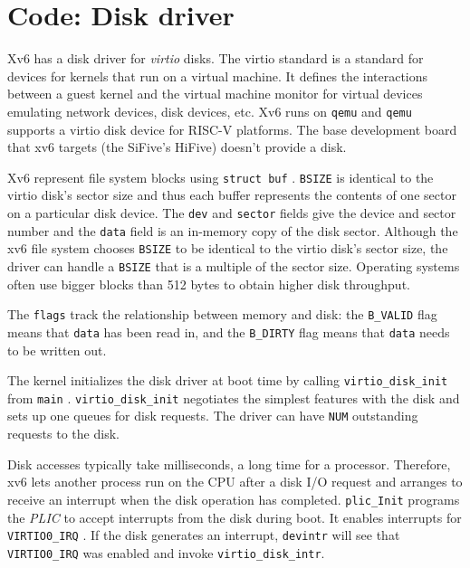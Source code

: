 \section{Code: Disk driver}

Xv6 has a disk driver for \textit{virtio} disks. The
virtio standard is a standard for devices for kernels that run on a
virtual machine.  It defines the interactions between a guest kernel
and the virtual machine monitor for virtual devices emulating network
devices, disk devices, etc.  Xv6 runs on \texttt{qemu} and
\texttt{qemu} supports a virtio disk device for RISC-V platforms.  The
base development board that xv6 targets (the SiFive's HiFive) doesn't
provide a disk.

Xv6 represent file system blocks using
\lstinline{struct buf}
.
\lstinline{BSIZE}
is identical to the virtio disk's sector size and thus
each buffer represents the contents of one sector on a particular
disk device.  The
\lstinline{dev}
and
\lstinline{sector}
fields give the device and sector
number and the
\lstinline{data}
field is an in-memory copy of the disk sector.
Although the xv6 file system chooses
\lstinline{BSIZE}
to be identical to the virtio disk's sector size, the driver can handle
a
\lstinline{BSIZE}
that is a multiple of the sector size. Operating systems often use
bigger blocks than 512 bytes to obtain higher disk throughput.

The
\lstinline{flags}
track the relationship between memory and disk:
the
\lstinline{B_VALID}
flag means that
\lstinline{data}
has been read in, and
the 
\lstinline{B_DIRTY} 
flag means that
\lstinline{data}
needs to be written out.


The kernel initializes the disk driver at boot time by calling
\lstinline{virtio_disk_init}
from
\lstinline{main}
.
\lstinline{virtio_disk_init} negotiates the simplest features with the
disk and sets up one queues for disk requests.  The driver can have
\lstinline{NUM} outstanding requests to the disk.

Disk accesses typically take milliseconds, a long time for a
processor.  Therefore, xv6 lets another process run on the CPU after a
disk I/O request and arranges to receive an interrupt when the disk
operation has completed.
\lstinline{plic_Init} programs
the \textit{PLIC} to accept interrupts from the disk during boot.  It
enables interrupts for \lstinline{VIRTIO0_IRQ}
.  If the disk generates an
interrupt, \lstinline{devintr}  will
see that \lstinline{VIRTIO0_IRQ} was enabled and invoke
\lstinline{virtio_disk_intr}.

